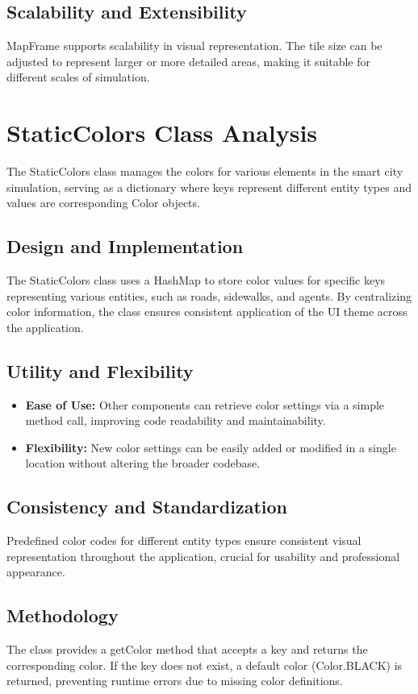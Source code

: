 \documentclass[conference]{IEEEtran}
\begin{document}
  \subsection{Scalability and Extensibility}
  MapFrame supports scalability in visual representation. The tile size can be adjusted to represent larger or more detailed areas, making it suitable for different scales of simulation.
  
  \section{StaticColors Class Analysis}
  The StaticColors class manages the colors for various elements in the smart city simulation, serving as a dictionary where keys represent different entity types and values are corresponding Color objects.
  
  \subsection{Design and Implementation}
  The StaticColors class uses a HashMap to store color values for specific keys representing various entities, such as roads, sidewalks, and agents. By centralizing color information, the class ensures consistent application of the UI theme across the application.
  
  \subsection{Utility and Flexibility}
  \begin{itemize}
  \item \textbf{Ease of Use:} Other components can retrieve color settings via a simple method call, improving code readability and maintainability.
  \item \textbf{Flexibility:} New color settings can be easily added or modified in a single location without altering the broader codebase.
  \end{itemize}
  
  \subsection{Consistency and Standardization}
  Predefined color codes for different entity types ensure consistent visual representation throughout the application, crucial for usability and professional appearance.
  
  \subsection{Methodology}
  The class provides a getColor method that accepts a key and returns the corresponding color. If the key does not exist, a default color (Color.BLACK) is returned, preventing runtime errors due to missing color definitions.
  
\end{document}
